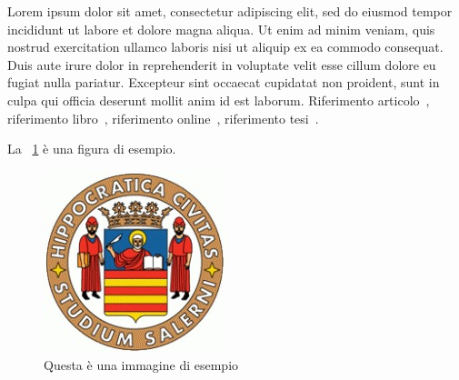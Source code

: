Lorem ipsum dolor sit amet, consectetur adipiscing elit, sed do eiusmod tempor incididunt ut labore et dolore magna aliqua. Ut enim ad minim veniam, quis nostrud exercitation ullamco laboris nisi ut aliquip ex ea commodo consequat. Duis aute irure dolor in reprehenderit in voluptate velit esse cillum dolore eu fugiat nulla pariatur. Excepteur sint occaecat cupidatat non proident, sunt in culpa qui officia deserunt mollit anim id est laborum. Riferimento articolo~\cite{articleExample}, riferimento libro~\cite{bookExample}, riferimento online~\cite{siteExample}, riferimento tesi~\cite{thesisExample}.

La \figurename~\ref{fig:esempio} è una figura di esempio.

\begin{figure}[htbp]
    \centering
    \includegraphics[scale=0.7]{./figures/logo_standard.jpg}
    \caption{Questa è una immagine di esempio}
    \label{fig:esempio}
\end{figure}
